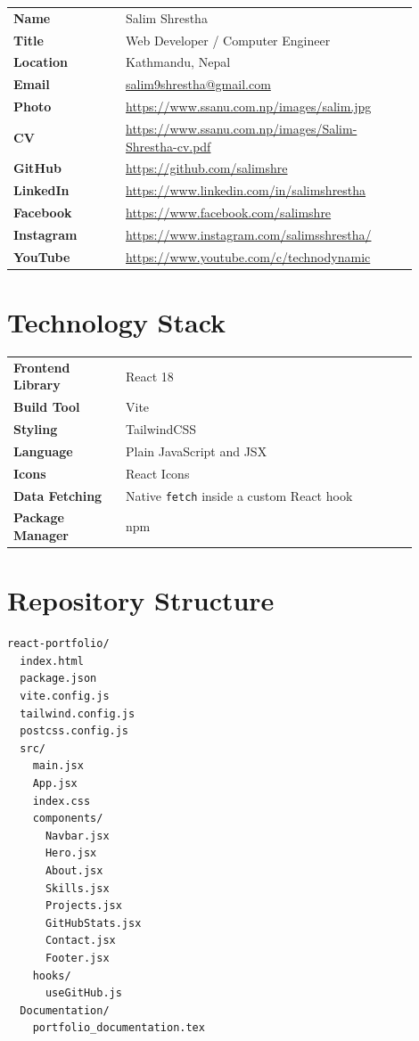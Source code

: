 \documentclass[12pt,a4paper]{article}
\newcommand{\code}[1]{\colorbox{CodeBg}{\texttt{#1}}}
\begin{document}
\begin{longtable}{>{\bfseries}p{0.25\linewidth}p{0.65\linewidth}}
Name & Salim Shrestha \\
Title & Web Developer / Computer Engineer \\
Location & Kathmandu, Nepal \\
Email & \href{mailto:salim9shrestha@gmail.com}{salim9shrestha@gmail.com} \\
Photo & \url{https://www.ssanu.com.np/images/salim.jpg} \\
CV & \url{https://www.ssanu.com.np/images/Salim-Shrestha-cv.pdf} \\
GitHub & \url{https://github.com/salimshre} \\
LinkedIn & \url{https://www.linkedin.com/in/salimshrestha} \\
Facebook & \url{https://www.facebook.com/salimshre} \\
Instagram & \url{https://www.instagram.com/salimsshrestha/} \\
YouTube & \url{https://www.youtube.com/c/technodynamic} \\
\end{longtable}

\section{Technology Stack}

\begin{longtable}{>{\bfseries}p{0.25\linewidth}p{0.65\linewidth}}
Frontend Library & React 18 \\
Build Tool & Vite \\
Styling & TailwindCSS \\
Language & Plain JavaScript and JSX \\
Icons & React Icons \\
Data Fetching & Native \code{fetch} inside a custom React hook \\
Package Manager & npm \\
\end{longtable}

\section{Repository Structure}

\begin{verbatim}
react-portfolio/
  index.html
  package.json
  vite.config.js
  tailwind.config.js
  postcss.config.js
  src/
    main.jsx
    App.jsx
    index.css
    components/
      Navbar.jsx
      Hero.jsx
      About.jsx
      Skills.jsx
      Projects.jsx
      GitHubStats.jsx
      Contact.jsx
      Footer.jsx
    hooks/
      useGitHub.js
  Documentation/
    portfolio_documentation.tex
\end{verbatim}
\end{document}
